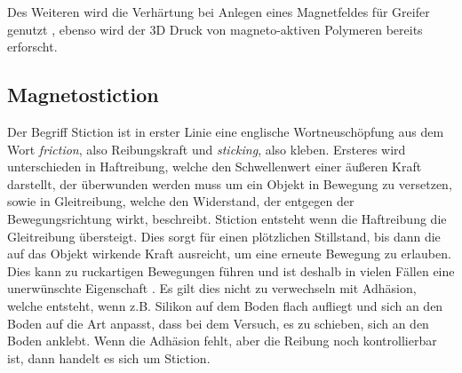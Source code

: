Des Weiteren wird die Verhärtung bei Anlegen eines Magnetfeldes für Greifer genutzt \cite{Qi_2020}, ebenso wird der 3D Druck von magneto-aktiven Polymeren \cite{Sindersberger_2018} bereits erforscht.

\subsection{Magnetostiction}

Der Begriff Stiction ist in erster Linie eine englische Wortneuschöpfung aus dem Wort \textit{friction}, also Reibungskraft und \textit{sticking}, also kleben. Ersteres wird unterschieden in Haftreibung, welche den Schwellenwert einer äußeren Kraft darstellt, der überwunden werden muss um ein Objekt in Bewegung zu versetzen, sowie in Gleitreibung, welche den Widerstand, der entgegen der Bewegungsrichtung wirkt, beschreibt. Stiction entsteht wenn die Haftreibung die Gleitreibung übersteigt. Dies sorgt für einen plötzlichen Stillstand, bis dann die auf das Objekt wirkende Kraft ausreicht, um eine erneute Bewegung zu erlauben. Dies kann zu ruckartigen Bewegungen führen und ist deshalb in vielen Fällen eine unerwünschte Eigenschaft \cite{Ruel2014STICTIONT}. Es gilt dies nicht zu verwechseln mit Adhäsion, welche entsteht, wenn z.B. Silikon auf dem Boden flach aufliegt und sich an den Boden auf die Art anpasst, dass bei dem Versuch, es zu schieben, sich an den Boden anklebt. Wenn die Adhäsion fehlt, aber die Reibung noch kontrollierbar ist, dann handelt es sich um Stiction. \cite{Monkman_2019}


	
